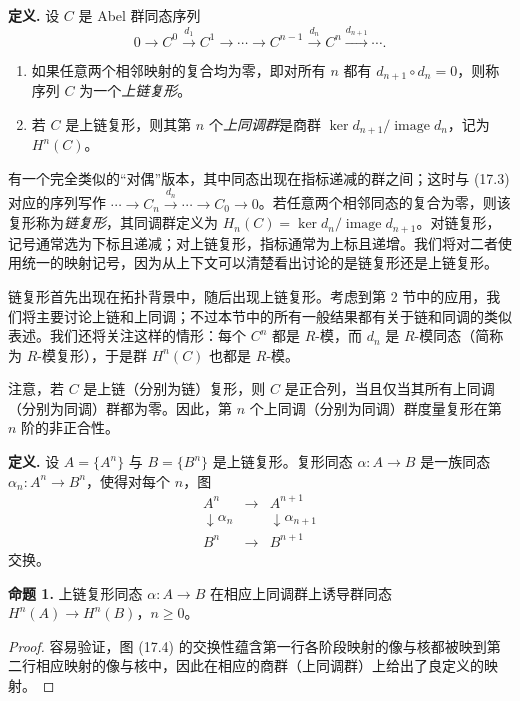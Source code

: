 \noindent\textbf{定义.} 设 $C$ 是 Abel 群同态序列
\[
  0\to C^0\xrightarrow{d_1} C^1\to\cdots\to C^{n-1}\xrightarrow{d_n} C^n\xrightarrow{d_{n+1}}\cdots .
  \tag{17.3}
\]
\begin{enumerate}[label=(\arabic*)]
  \item 如果任意两个相邻映射的复合均为零，即对所有 $n$ 都有 $d_{n+1}\circ d_n=0$，则称序列 $C$ 为一个\emph{上链复形}。
  \item 若 $C$ 是上链复形，则其第 $n$ 个\emph{上同调群}是商群 $\ker d_{n+1}/\operatorname{image}d_n$，记为 $H^n(C)$。
\end{enumerate}

有一个完全类似的“对偶”版本，其中同态出现在指标递减的群之间；这时与 (17.3) 对应的序列写作 $\cdots\to C_n\xrightarrow{d_n}\cdots\to C_0\to0$。若任意两个相邻同态的复合为零，则该复形称为\emph{链复形}，其同调群定义为 $H_n(C)=\ker d_n/\operatorname{image}d_{n+1}$。对链复形，记号通常选为下标且递减；对上链复形，指标通常为上标且递增。我们将对二者使用统一的映射记号，因为从上下文可以清楚看出讨论的是链复形还是上链复形。

链复形首先出现在拓扑背景中，随后出现上链复形。考虑到第 2 节中的应用，我们将主要讨论上链和上同调；不过本节中的所有一般结果都有关于链和同调的类似表述。我们还将关注这样的情形：每个 $C^n$ 都是 $R$-模，而 $d_n$ 是 $R$-模同态（简称为 $R$-模复形），于是群 $H^n(C)$ 也都是 $R$-模。

注意，若 $C$ 是上链（分别为链）复形，则 $C$ 是正合列，当且仅当其所有上同调（分别为同调）群都为零。因此，第 $n$ 个上同调（分别为同调）群度量复形在第 $n$ 阶的非正合性。

\noindent\textbf{定义.} 设 $A=\{A^n\}$ 与 $B=\{B^n\}$ 是上链复形。复形同态 $\alpha:A\to B$ 是一族同态 $\alpha_n:A^n\to B^n$，使得对每个 $n$，图
\[
\begin{array}{ccc}
A^n & \longrightarrow & A^{n+1}\\
\downarrow\alpha_n && \downarrow\alpha_{n+1}\\
B^n & \longrightarrow & B^{n+1}
\end{array}
\tag{17.4}
\]
交换。

\medskip
\noindent\textbf{命题 1.} 上链复形同态 $\alpha:A\to B$ 在相应上同调群上诱导群同态 $H^n(A)\to H^n(B)$，$n\geq0$。

\begin{proof}
容易验证，图 (17.4) 的交换性蕴含第一行各阶段映射的像与核都被映到第二行相应映射的像与核中，因此在相应的商群（上同调群）上给出了良定义的映射。
\end{proof}

